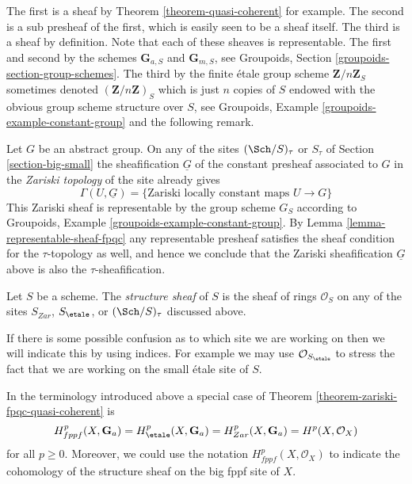 \noindent
The first is a sheaf by
Theorem \ref{theorem-quasi-coherent}
for example. The second is a sub presheaf of the first, which is easily seen
to be a sheaf itself. The third is a sheaf by definition.
Note that each of these sheaves is representable.
The first and second by the schemes $\mathbf{G}_{a, S}$ and
$\mathbf{G}_{m, S}$, see
Groupoids, Section \ref{groupoids-section-group-schemes}.
The third by the finite \'etale group scheme $\mathbf{Z}/n\mathbf{Z}_S$
sometimes denoted $(\mathbf{Z}/n\mathbf{Z})_S$
which is just $n$ copies of $S$ endowed
with the obvious group scheme structure over $S$, see
Groupoids, Example \ref{groupoids-example-constant-group}
and the following remark.

\begin{remark}
\label{remark-constant-locally-constant-maps}
Let $G$ be an abstract group.
On any of the sites $(\Sch/S)_\tau$ or $S_\tau$ of
Section \ref{section-big-small}
the sheafification $\underline{G}$
of the constant presheaf associated to $G$ in the
{\it Zariski topology} of the site already gives
$$
\Gamma(U, \underline{G}) =
\{\text{Zariski locally constant maps }U \to G\}
$$
This Zariski sheaf is representable by the group scheme $G_S$ according to
Groupoids, Example \ref{groupoids-example-constant-group}.
By
Lemma \ref{lemma-representable-sheaf-fpqc}
any representable presheaf satisfies the sheaf condition for the
$\tau$-topology as well, and hence we conclude that the Zariski
sheafification $\underline{G}$ above is also the $\tau$-sheafification.
\end{remark}

\begin{definition}
\label{definition-structure-sheaf}
Let $S$ be a scheme. The {\it structure sheaf} of $S$ is the sheaf of rings
$\mathcal{O}_S$
on any of the sites $S_{Zar}$, $S_\etale$, or $(\Sch/S)_\tau$
discussed above.
\end{definition}

\noindent
If there is some possible confusion as to which site we are working on
then we will indicate this by using indices. For example we may use
$\mathcal{O}_{S_\etale}$ to stress the fact that we are working on the
small \'etale site of $S$.

\begin{remark}
\label{remark-special-case-fpqc-cohomology-quasi-coherent}
In the terminology introduced above a special case of
Theorem \ref{theorem-zariski-fpqc-quasi-coherent}
is
$$
H_{fppf}^p(X, \mathbf{G}_a) =
H_\etale^p(X, \mathbf{G}_a) =
H_{Zar}^p(X, \mathbf{G}_a) =
H^p(X, \mathcal{O}_X)
$$
for all $p \geq 0$. Moreover, we could use the notation
$H^p_{fppf}(X, \mathcal{O}_X)$ to indicate the cohomology of the
structure sheaf on the big fppf site of $X$.
\end{remark}




